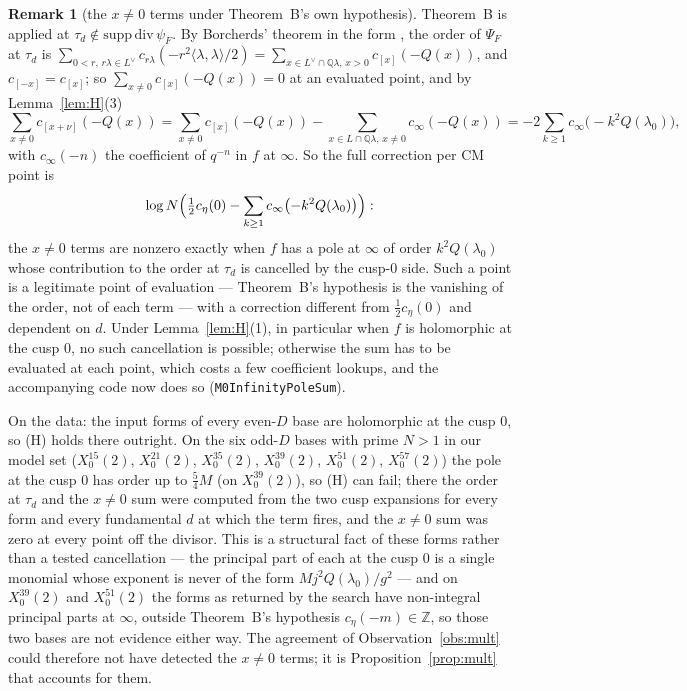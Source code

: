 \documentclass[11pt,reqno]{amsart}
\theoremstyle{plain}
\theoremstyle{definition}
\newtheorem{remark}[theorem]{Remark}
\newcommand{\Q}{\mathbb{Q}}
\newcommand{\Z}{\mathbb{Z}}
\newcommand{\Ldual}{L^{\vee}}
\begin{document}
\begin{remark}[the $x\neq0$ terms under Theorem~B's own hypothesis]\label{rem:xsum}
Theorem~B is applied at $\tau_d\notin\mathrm{supp}\,\mathrm{div}\,\psi_F$. By Borcherds' theorem
in the form \cite[Thm.~A(2)]{Yang}, the order of $\Psi_F$ at $\tau_d$ is $\sum_{0<r,\,r\lambda\in
\Ldual}c_{r\lambda}(-r^2\langle\lambda,\lambda\rangle/2)=\sum_{x\in\Ldual\cap\Q\lambda,\,x>0}
c_{[x]}(-Q(x))$, and $c_{[-x]}=c_{[x]}$; so $\sum_{x\neq0}c_{[x]}(-Q(x))=0$ at an evaluated point,
and by Lemma~\ref{lem:H}(3)
\[
  \sum_{x\neq0}c_{[x+\nu]}(-Q(x))
   =\sum_{x\neq0}c_{[x]}(-Q(x))-\sum_{x\in L\cap\Q\lambda,\,x\neq0}c_\infty(-Q(x))
   =-2\sum_{k\ge1}c_\infty\bigl(-k^2Q(\lambda_0)\bigr),
\]
with $c_\infty(-n)$ the coefficient of $q^{-n}$ in $f$ at $\infty$. So the full correction per CM
point is
\[
  \log N\Bigl(\tfrac12c_\eta(0)-\sum_{k\ge1}c_\infty\bigl(-k^2Q(\lambda_0)\bigr)\Bigr):
\]
the $x\neq0$ terms are nonzero exactly when $f$ has a pole at $\infty$ of order $k^2Q(\lambda_0)$
whose contribution to the order at $\tau_d$ is cancelled by the cusp-$0$ side. Such a point is a
legitimate point of evaluation --- Theorem~B's hypothesis is the vanishing of the order, not of
each term --- with a correction different from $\tfrac12c_\eta(0)$ and dependent on $d$. Under
Lemma~\ref{lem:H}(1), in particular when $f$ is holomorphic at the cusp $0$, no such cancellation
is possible; otherwise the sum has to be evaluated at each point, which costs a few coefficient
lookups, and the accompanying code now does so (\texttt{M0InfinityPoleSum}).

On the data: the input forms of every even-$D$ base are holomorphic at the cusp $0$, so (H) holds
there outright. On the six odd-$D$ bases with prime $N>1$ in our model set
($X_0^{15}(2)$, $X_0^{21}(2)$, $X_0^{35}(2)$, $X_0^{39}(2)$, $X_0^{51}(2)$, $X_0^{57}(2)$) the
pole at the cusp $0$ has order up to $\tfrac54M$ (on $X_0^{39}(2)$), so (H) can fail; there the
order at $\tau_d$ and the $x\neq0$ sum were computed from the two cusp expansions for every form
and every fundamental $d$ at which the term fires, and the $x\neq0$ sum was zero at every point
off the divisor. This is a structural fact of these forms rather than a tested cancellation --- the
principal part of each at the cusp $0$ is a single monomial whose exponent is never of the form
$Mj^2Q(\lambda_0)/g^2$ --- and on $X_0^{39}(2)$ and $X_0^{51}(2)$ the forms as returned by the
search have non-integral principal parts at $\infty$, outside Theorem~B's hypothesis
$c_\eta(-m)\in\Z$, so those two bases are not evidence either way. The agreement of
Observation~\ref{obs:mult} could therefore not have detected the $x\neq0$ terms; it is
Proposition~\ref{prop:mult} that accounts for them.
\end{remark}
\end{document}
